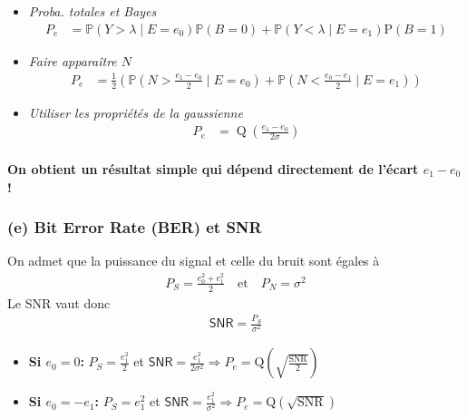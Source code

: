 \documentclass[11pt]{article}
\providecommand{\tightlist}{%
      \setlength{\itemsep}{0pt}\setlength{\parskip}{0pt}}
\begin{document}
\begin{itemize}
\item
  \emph{Proba. totales et Bayes} \begin{align}
    P_e &= \mathbb{P}(Y>\lambda \mid E=e_0) \mathbb{P}(B=0)+\mathbb{P}(Y<\lambda \mid E=e_1) \mathrm{P}(B=1)
  \end{align}
\item
  \emph{Faire apparaître \(N\)} \begin{align}
     P_e &= \frac{1}{2}\left(\mathbb{P}\left(N>\frac{e_1-e_0}{2} \mid E=e_0\right) + \mathbb{P}\left(N<\frac{e_0-e_1}{2} \mid E=e_1\right)\right)
  \end{align}
\item
  \emph{Utiliser les propriétés de la gaussienne} \begin{align}
    P_e &= \operatorname{Q}\left(\frac{e_1-e_0}{2\sigma}\right)
  \end{align}
\end{itemize}

\hypertarget{on-obtient-un-ruxe9sultat-simple-qui-duxe9pend-directement-de-luxe9cart-e_1---e_0}{%
\paragraph{\texorpdfstring{On obtient un résultat simple qui dépend
directement de l'écart \(e_1 - e_0\)
!}{On obtient un résultat simple qui dépend directement de l'écart e\_1 - e\_0 !}}\label{on-obtient-un-ruxe9sultat-simple-qui-duxe9pend-directement-de-luxe9cart-e_1---e_0}}

    \hypertarget{e-bit-error-rate-ber-et-snr}{%
\subsubsection{(e) Bit Error Rate (BER) et
SNR}\label{e-bit-error-rate-ber-et-snr}}

On admet que la puissance du signal et celle du bruit sont égales à
\begin{align}
    P_S = \frac{e_0^2 + e_1^2}{2}\quad\text{et}\quad P_N = \sigma^2
\end{align} Le SNR vaut donc \begin{align}
    \mathsf{SNR} = \frac{P_S}{\sigma^2}
\end{align}

\begin{itemize}
\tightlist
\item
  \textbf{Si \(e_0 = 0\):} \(P_S = \frac{e_1^2}{2}\) et
  \(\mathsf{SNR} = \frac{e_1^2}{2\sigma^2} \Rightarrow P_e = \mathrm{Q}\left(\sqrt{\frac{\mathrm{SNR}}{2}}\right)\)
\item
  \textbf{Si \(e_0 = -e_1\):} \(P_S = e_1^2\) et
  \(\mathsf{SNR} = \frac{e_1^2}{\sigma^2} \Rightarrow P_e = \mathrm{Q}\left(\sqrt{\mathrm{SNR}}\right)\)
\end{itemize}
\end{document}
